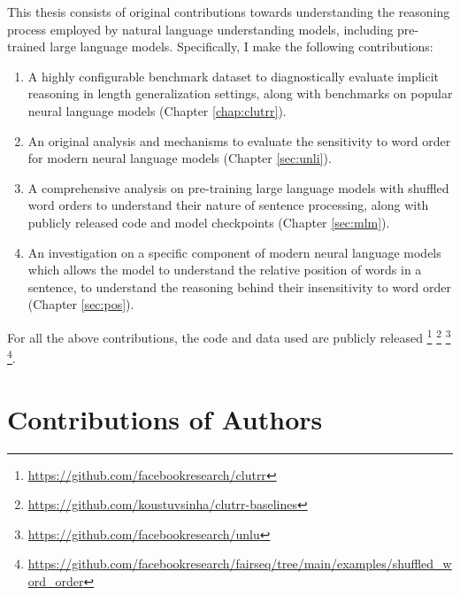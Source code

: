 \documentclass[letterpaper, 12pt]{report}
\begin{document}
This thesis consists of original contributions towards understanding the reasoning process employed by natural language understanding models, including pre-trained large language models. Specifically, I make the following contributions:

\begin{enumerate}
  \item A highly configurable benchmark dataset to diagnostically evaluate implicit reasoning in length generalization settings, along with benchmarks on popular neural language models (Chapter \autoref{chap:clutrr}).
  \item An original analysis and mechanisms to evaluate the sensitivity to word order for modern neural language models (Chapter \autoref{sec:unli}).
  \item A comprehensive analysis on pre-training large language models with shuffled word orders to understand their nature of sentence processing, along with publicly released code and model checkpoints (Chapter \autoref{sec:mlm}).
  \item An investigation on a specific component of modern neural language models which allows the model to understand the relative position of words in a sentence, to understand the reasoning behind their insensitivity to word order (Chapter \autoref{sec:pos}).
\end{enumerate}

For all the above contributions, the code and data used are publicly released
\footnote{\href{https://github.com/facebookresearch/clutrr}{https://github.com/facebookresearch/clutrr}}
\footnote{\href{https://github.com/koustuvsinha/clutrr-baselines}{https://github.com/koustuvsinha/clutrr-baselines}}
\footnote{\href{https://github.com/facebookresearch/unlu}{https://github.com/facebookresearch/unlu}}
\footnote{\href{https://github.com/facebookresearch/fairseq/tree/main/examples/shuffled_word_order}{https://github.com/facebookresearch/fairseq/tree/main/examples/shuffled_word_order}}.

\chapter*{Contributions of Authors}
\label{sec:cont_authors}
\end{document}
